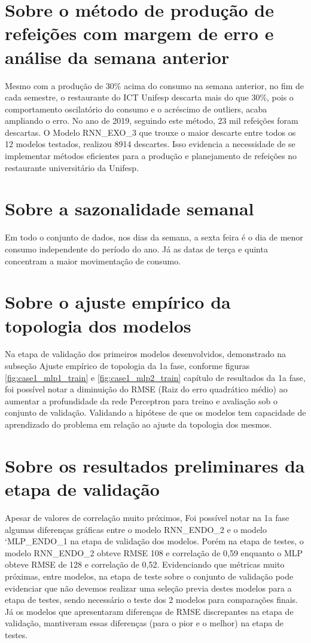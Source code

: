 \documentclass[	12pt, Times, openright, twoside, a4paper, english, brazil]{abntex2}
\begin{document}
    \section{Sobre o método de produção de refeições com margem de erro e análise da semana anterior}
        Mesmo com a produção de 30\% acima do consumo na semana anterior, no fim de cada semestre, o restaurante do ICT Unifesp descarta mais do que 30\%, pois o comportamento oscilatório do consumo e o acréscimo de outliers, acaba ampliando o erro. No ano de 2019, seguindo este método, 23 mil refeições foram descartas.
        O Modelo RNN\_EXO\_3 que trouxe o maior descarte entre todos os 12 modelos testados, realizou 8914 descartes.
        Isso evidencia a necessidade de se implementar métodos eficientes para a produção e planejamento de refeições no restaurante universitário da Unifesp.
    
    \section{Sobre a sazonalidade semanal}
        Em todo o conjunto de dados, nos dias da semana, a sexta feira é o dia de menor consumo independente do período do ano. Já as datas de terça e quinta concentram a maior movimentação de consumo.
    
    \section{Sobre o ajuste empírico da topologia dos modelos}
        Na etapa de validação dos primeiros modelos desenvolvidos, demonstrado na subseção Ajuste empírico de topologia da 1a fase, conforme figuras \ref{fig:case1_mlp1_train} e \ref{fig:case1_mlp2_train} capítulo de resultados da 1a fase, foi possível notar a diminuição do RMSE (Raiz do erro quadrático médio) ao aumentar a profundidade da rede Perceptron para treino e avaliação sob o conjunto de validação. Validando a hipótese de que os modelos tem capacidade de aprendizado do problema em relação ao ajuste da topologia dos mesmos.
        
    \section{Sobre os resultados preliminares da etapa de validação}
        Apesar de valores de correlação muito próximos, Foi possível notar na 1a fase algumas diferenças gráficas entre o modelo RNN\_ENDO\_2 e o modelo `MLP\_ENDO\_1 na etapa de validação dos modelos.  Porém na etapa de testes, o modelo  RNN\_ENDO\_2 obteve RMSE 108 e correlação de 0,59 enquanto o MLP obteve RMSE de 128 e correlação de 0,52. Evidenciando que métricas muito próximas, entre modelos, na etapa de teste sobre o conjunto de validação pode evidenciar que não devemos realizar uma seleção previa destes modelos para a etapa de testes, sendo necessário o teste dos 2 modelos para comparações finais. Já os modelos que apresentaram diferenças de RMSE discrepantes na etapa de validação, mantiveram essas diferenças (para o pior e o melhor) na etapa de testes.
\end{document}
